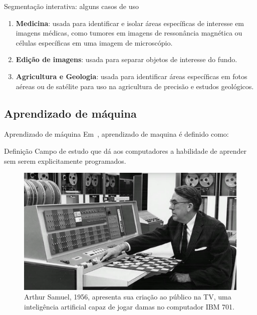 \documentclass{templatebeamerufc/libs/ufc_format}
\begin{document}
\begin{frame}{Segmentação interativa: alguns casos de uso}
  \begin{enumerate}
  \item \textbf{Medicina}: usada para identificar e isolar áreas específicas de
    interesse em imagens médicas, como tumores em imagens de
    ressonância magnética ou células específicas em uma imagem de
    microscópio.

  \item \textbf{Edição de imagens}: usada para separar objetos de interesse do fundo.

  \item \textbf{Agricultura e Geologia}: usada para identificar áreas específicas
em fotos aéreas ou de satélite para uso na agricultura de precisão e
estudos geológicos.
  \end{enumerate}
\end{frame}

\subsection{Aprendizado de máquina}

\begin{frame}{Aprendizado de máquina}
  Em~\cite{samuel1959some}, aprendizado de maquina é definido como:

  \begin{block}{Definição} Campo de estudo que dá aos computadores a
    habilidade de aprender sem serem explicitamente programados.
  \end{block}

  \pause{}

  \begin{figure}\label{fig:samuel}
    \centering
    \caption{
      Arthur Samuel, 1956, apresenta sua criação ao público na
      TV, uma inteligência artificial capaz de jogar damas no
      computador IBM 701.
    }
    \includegraphics[scale=0.18]{figuras/samuel}
  \end{figure}
\end{frame}
\end{document}

